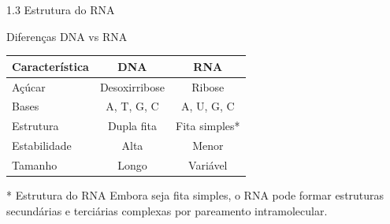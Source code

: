 \begin{frame}[allowframebreaks]{1.3 Estrutura do RNA}
\begin{block}{Diferenças DNA vs RNA}
\begin{center}
\begin{tabular}{lcc}
\toprule
\textbf{Característica} & \textbf{DNA} & \textbf{RNA} \\
\midrule
Açúcar & Desoxirribose & Ribose \\
Bases & A, T, G, C & A, U, G, C \\
Estrutura & Dupla fita & Fita simples* \\
Estabilidade & Alta & Menor \\
Tamanho & Longo & Variável \\
\bottomrule
\end{tabular}
\end{center}
\end{block}

\vspace{0.2cm}

\begin{exampleblock}{* Estrutura do RNA}
Embora seja fita simples, o RNA pode formar estruturas secundárias e terciárias complexas por pareamento intramolecular.
\end{exampleblock}
\end{frame}

